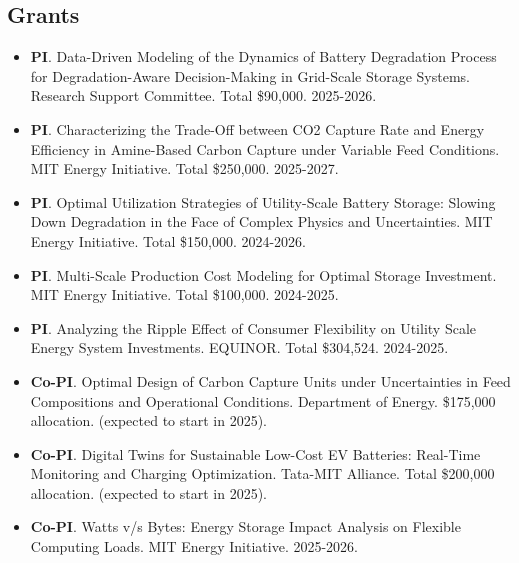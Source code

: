 \subsection*{Grants}
\begin{itemize}[itemsep=1pt, parsep=0pt,leftmargin=*]
\item[] \textbf{PI}. Data-Driven Modeling of the Dynamics of Battery Degradation Process for Degradation-Aware Decision-Making in Grid-Scale Storage Systems.  Research Support Committee. Total \$90,000. 2025-2026.
\item[] \textbf{PI}. Characterizing the Trade-Off between CO2 Capture Rate and Energy Efficiency in Amine-Based Carbon Capture under Variable Feed Conditions. MIT Energy Initiative. Total \$250,000. 2025-2027.
\item[] \textbf{PI}. Optimal Utilization Strategies of Utility-Scale Battery Storage: Slowing Down Degradation in the Face of Complex Physics and Uncertainties. MIT Energy Initiative. Total \$150,000. 2024-2026.
\item[] \textbf{PI}. Multi-Scale Production Cost Modeling for Optimal Storage Investment. MIT Energy Initiative. Total \$100,000. 2024-2025.
\item[] \textbf{PI}. Analyzing the Ripple Effect of Consumer Flexibility on Utility Scale Energy System Investments. EQUINOR. Total \$304,524. 2024-2025.
\item[] \textbf{Co-PI}. Optimal Design of Carbon Capture Units under Uncertainties in Feed
Compositions and Operational Conditions. Department of Energy. \$175,000 allocation. (expected to start in 2025). 
\item[] \textbf{Co-PI}. Digital Twins for Sustainable Low-Cost EV Batteries: Real-Time Monitoring and Charging Optimization. Tata-MIT Alliance. Total \$200,000 allocation. (expected to start in 2025).
\item[] \textbf{Co-PI}. Watts v/s Bytes: Energy Storage Impact Analysis on Flexible Computing Loads. MIT Energy Initiative. 2025-2026.
\end{itemize}
